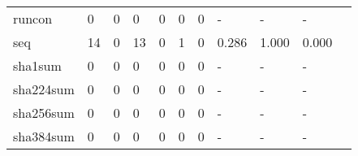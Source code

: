 \begin{longtable}{lp{1.2cm}p{1.2cm}p{1.2cm}p{1.2cm}p{1.2cm}p{1.2cm}p{1.2cm}p{1.2cm}p{1.2cm}p{1.2cm}}
runcon    &                                     0 &                                                  0 &                                                0 &                                               0 &                                                0 &                                              0 &                                             - &                                                  - &                                                  - \\
seq       &                                    14 &                                                  0 &                                               13 &                                               0 &                                                1 &                                              0 &                                         0.286 &                                              1.000 &                                              0.000 \\
sha1sum   &                                     0 &                                                  0 &                                                0 &                                               0 &                                                0 &                                              0 &                                             - &                                                  - &                                                  - \\
sha224sum &                                     0 &                                                  0 &                                                0 &                                               0 &                                                0 &                                              0 &                                             - &                                                  - &                                                  - \\
sha256sum &                                     0 &                                                  0 &                                                0 &                                               0 &                                                0 &                                              0 &                                             - &                                                  - &                                                  - \\
sha384sum &                                     0 &                                                  0 &                                                0 &                                               0 &                                                0 &                                              0 &                                             - &                                                  - &                                                  - \\

\end{longtable}
